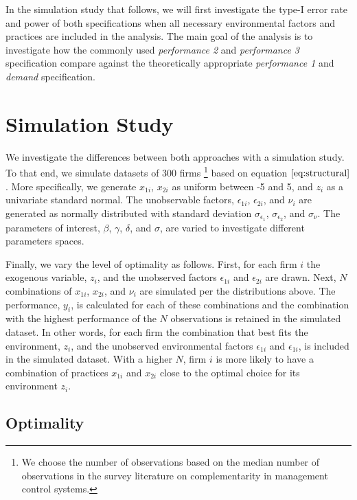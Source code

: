 \documentclass[12pt]{article}
\begin{document}
In the simulation study that follows, we will first investigate the type-I error rate and power of both specifications when all necessary environmental factors and practices are included in the analysis. The main goal of the analysis is to investigate how the commonly used \emph{performance 2} and \emph{performance 3} specification compare against the theoretically appropriate \emph{performance 1} and \emph{demand} specification.

\section{Simulation Study}\label{simulation-study}

We investigate the differences between both approaches with a simulation
study. To that end, we simulate datasets of 300 firms \footnote{We
  choose the number of observations based on the median number of
  observations in the survey literature on complementarity in management
  control systems.} based on equation \(\eqref{eq:structural}\). More
specifically, we generate \(x_{1i}\), \(x_{2i}\) as uniform between -5
and 5, and \(z_i\) as a univariate standard normal. The unobservable
factors, \(\epsilon_{1i}\), \(\epsilon_{2i}\), and \(\nu_i\) are
generated as normally distributed with standard deviation
\(\sigma_{\epsilon_1}\), \(\sigma_{\epsilon_2}\), and \(\sigma_{\nu}\).
The parameters of interest, \(\beta\), \(\gamma\), \(\delta\), and
\(\sigma\), are varied to investigate different parameters spaces.

Finally, we vary the level of optimality as follows. First, for each
firm \(i\) the exogenous variable, \(z_i\), and the unobserved factors
\(\epsilon_{1i}\) and \(\epsilon_{2i}\) are drawn. Next, \(N\)
combinations of \(x_{1i}\), \(x_{2i}\), and \(\nu_i\) are simulated per
the distributions above. The performance, \(y_i\), is calculated for
each of these combinations and the combination with the highest
performance of the \(N\) observations is retained in the simulated
dataset. In other words, for each firm the combination that best fits
the environment, \(z_i\), and the unobserved environmental factors
\(\epsilon_{1i}\) and \(\epsilon_{1i}\), is included in the simulated
dataset. With a higher \(N\), firm \(i\) is more likely to have a
combination of practices \(x_{1i}\) and \(x_{2i}\) close to the optimal
choice for its environment \(z_i\).

\subsection{Optimality}\label{optimality}
\end{document}
